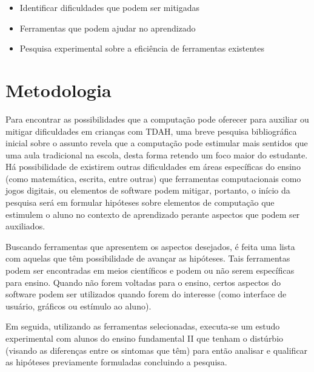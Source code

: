 \begin{itemize}
\item Identificar dificuldades que podem ser mitigadas
\item Ferramentas que podem ajudar no aprendizado
\item Pesquisa experimental sobre a eficiência de ferramentas existentes
\end{itemize}

\section{Metodologia}
Para encontrar as possibilidades que a computação pode oferecer para auxiliar ou mitigar dificuldades em crianças com TDAH, uma breve pesquisa bibliográfica inicial sobre o assunto revela que a computação pode estimular mais sentidos que uma aula tradicional na escola, desta forma retendo um foco maior do estudante. Há possibilidade de existirem outras dificuldades em áreas específicas do ensino (como matemática, escrita, entre outras) que ferramentas computacionais como jogos digitais, ou elementos de software podem mitigar, portanto, o início da pesquisa será em formular hipóteses sobre elementos de computação que estimulem o aluno no contexto de aprendizado perante aspectos que podem ser auxiliados.

Buscando ferramentas que apresentem os aspectos desejados, é feita uma lista com aquelas que têm possibilidade de avançar as hipóteses. Tais ferramentas podem ser encontradas em meios científicos e podem ou não serem específicas para ensino. Quando não forem voltadas para o ensino, certos aspectos do software podem ser utilizados quando forem do interesse (como interface de usuário, gráficos ou estímulo ao aluno).

Em seguida, utilizando as ferramentas selecionadas, executa-se um estudo experimental com alunos do ensino fundamental II que tenham o distúrbio (visando as diferenças entre os sintomas que têm) para então analisar e qualificar as hipóteses previamente formuladas concluindo a pesquisa.
